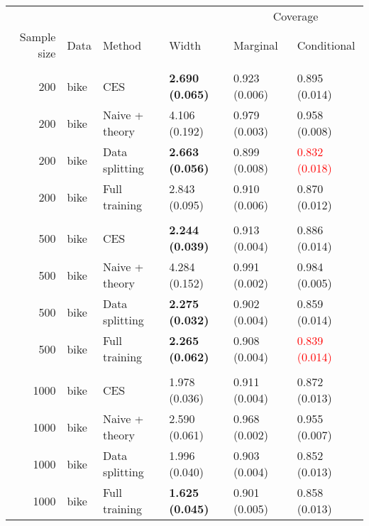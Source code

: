 \begin{tabular}[t]{rlllll}
\toprule
\multicolumn{4}{c}{ } & \multicolumn{2}{c}{Coverage} \\
\cmidrule(l{3pt}r{3pt}){5-6}
Sample size & Data & Method & Width & Marginal & Conditional\\
\midrule
\addlinespace[0.3em]
\multicolumn{6}{l}{\textbf{200}}\\
\hspace{1em}200 & bike & CES & \textbf{2.690 (0.065)} & 0.923 (0.006) & 0.895 (0.014)\\
\hspace{1em}200 & bike & Naive + theory & 4.106 (0.192) & 0.979 (0.003) & 0.958 (0.008)\\
\hspace{1em}200 & bike & Data splitting & \textbf{2.663 (0.056)} & 0.899 (0.008) & \textcolor{red}{0.832 (0.018)}\\
\hspace{1em}200 & bike & Full training & 2.843 (0.095) & 0.910 (0.006) & 0.870 (0.012)\\
\addlinespace[0.3em]
\multicolumn{6}{l}{\textbf{500}}\\
\hspace{1em}500 & bike & CES & \textbf{2.244 (0.039)} & 0.913 (0.004) & 0.886 (0.014)\\
\hspace{1em}500 & bike & Naive + theory & 4.284 (0.152) & 0.991 (0.002) & 0.984 (0.005)\\
\hspace{1em}500 & bike & Data splitting & \textbf{2.275 (0.032)} & 0.902 (0.004) & 0.859 (0.014)\\
\hspace{1em}500 & bike & Full training & \textbf{2.265 (0.062)} & 0.908 (0.004) & \textcolor{red}{0.839 (0.014)}\\
\addlinespace[0.3em]
\multicolumn{6}{l}{\textbf{1000}}\\
\hspace{1em}1000 & bike & CES & 1.978 (0.036) & 0.911 (0.004) & 0.872 (0.013)\\
\hspace{1em}1000 & bike & Naive + theory & 2.590 (0.061) & 0.968 (0.002) & 0.955 (0.007)\\
\hspace{1em}1000 & bike & Data splitting & 1.996 (0.040) & 0.903 (0.004) & 0.852 (0.013)\\
\hspace{1em}1000 & bike & Full training & \textbf{1.625 (0.045)} & 0.901 (0.005) & 0.858 (0.013)\\

\end{tabular}

